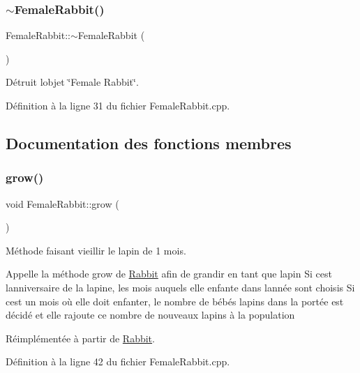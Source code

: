 \subsubsection{\texorpdfstring{$\sim$\+Female\+Rabbit()}{~FemaleRabbit()}}
{\footnotesize\ttfamily Female\+Rabbit\+::$\sim$\+Female\+Rabbit (\begin{DoxyParamCaption}{ }\end{DoxyParamCaption})}



Détruit l\textquotesingle{}objet \char`\"{}\+Female Rabbit\char`\"{}. 



Définition à la ligne 31 du fichier Female\+Rabbit.\+cpp.



\subsection{Documentation des fonctions membres}
\mbox{\label{classFemaleRabbit_ad938ea7eca97c53e89d11392b6856ebd}} 
\subsubsection{\texorpdfstring{grow()}{grow()}}
{\footnotesize\ttfamily void Female\+Rabbit\+::grow (\begin{DoxyParamCaption}{ }\end{DoxyParamCaption})\hspace{0.3cm}{\ttfamily [virtual]}}



Méthode faisant vieillir le lapin de 1 mois. 

Appelle la méthode grow de \hyperlink{classRabbit}{Rabbit} afin de grandir en tant que lapin Si c\textquotesingle{}est l\textquotesingle{}anniversaire de la lapine, les mois auquels elle enfante dans l\textquotesingle{}année sont choisis Si c\textquotesingle{}est un mois où elle doit enfanter, le nombre de bébés lapins dans la portée est décidé et elle rajoute ce nombre de nouveaux lapins à la population 

Réimplémentée à partir de \hyperlink{classRabbit_a404af8877c99ddc98108d88c8e466013}{Rabbit}.



Définition à la ligne 42 du fichier Female\+Rabbit.\+cpp.

